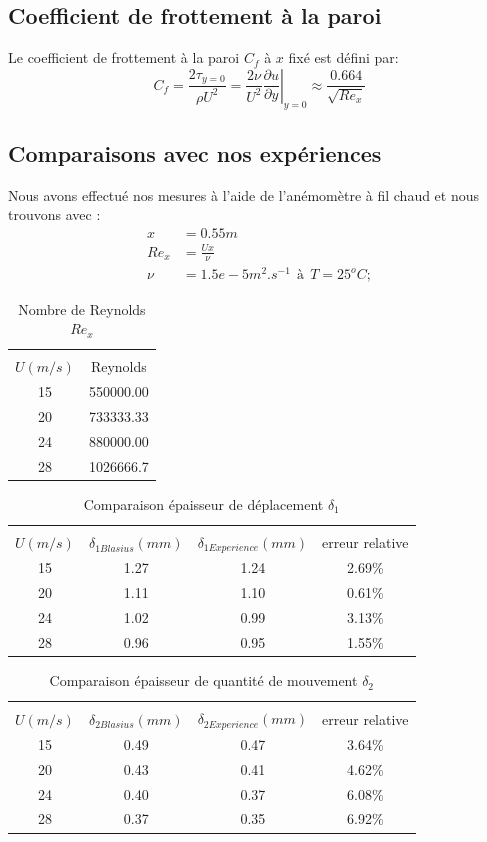 \subsection{Coefficient de frottement à la paroi}
Le coefficient de frottement à la paroi $C_{f}$ à $x$ fixé est défini par:
\begin{equation}
	C_{f} =
	\frac{2\tau_{y=0}}{\rho U^{2}} =
	\frac{2\nu}{U^{2}}
	\left.
	\frac{\partial u}{\partial y}
	\right|_{y = 0} \approx \frac{0.664}{\sqrt{Re_{x}}}
\end{equation}
\subsection{Comparaisons avec nos expériences}
Nous avons effectué nos mesures à l'aide de l'anémomètre à fil chaud et nous trouvons avec :
\begin{align*}
	x &= 0.55m\\
	Re_{x} &= \frac{Ux}{\nu}\\
	\nu &= 1.5e-5 m^{2}.s^{-1}~~\text{à}~~T = 25^{o}C; 
\end{align*}
\begin{table}[ht]
	\centering
	\begin{tabular}{cc}
		\hline\\
		$U(m/s)$ & Reynolds\\
		\hline
   15 & 550000.00\\
   20 & 733333.33\\
   24 & 880000.00\\
   28 & 1026666.7
	\end{tabular}
	\caption{Nombre de Reynolds $Re_{x}$}
\end{table}
\begin{table}[ht]
	\centering
	\begin{tabular}{cccc}
		\hline\\
		$U(m/s)$ & $\delta_{1Blasius}(mm)$ &
		$ \delta_{1Experience}(mm)$ & 
		 erreur relative\\
		\hline
		15   & 1.27   & 1.24   & 2.69\%\\
		20   & 1.11   & 1.10   & 0.61\%\\
		24   & 1.02   & 0.99   & 3.13\%\\
		28   & 0.96   & 0.95   & 1.55\%
	\end{tabular}
	\caption{Comparaison épaisseur de déplacement $\delta_{1}$}
\end{table}
\begin{table}[ht]
	\centering
	\begin{tabular}{cccc}
		\hline\\
		$U(m/s)$ & $\delta_{2Blasius}(mm)$ &
		$ \delta_{2Experience}(mm)$ & 
		 erreur relative\\
		\hline
   15 & 0.49   & 0.47   & 3.64\%\\
   20 & 0.43   & 0.41   & 4.62\%\\
   24 & 0.40   & 0.37   & 6.08\%\\
   28 & 0.37   & 0.35   & 6.92\%
	\end{tabular}
	\caption{Comparaison épaisseur de quantité de mouvement $\delta_{2}$}
\end{table}
